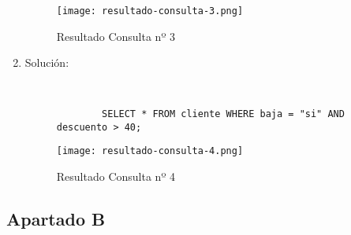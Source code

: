 \begin{enumerate}
    \begin{figure}[H]
        \centering
        \texttt{[image: resultado-consulta-3.png]}
        \caption{Resultado Consulta nº 3}
    \end{figure}

    \item Solución:

    \begin{figure}[H]
        \begin{tcolorbox}[sharp corners, colback=yellow!30, colframe=white!20]
            \scriptsize
            \begin{verbatim}


        SELECT * FROM cliente WHERE baja = "si" AND descuento > 40;
            \end{verbatim}
        \end{tcolorbox}
    \end{figure}

    \begin{figure}[H]
        \centering
        \texttt{[image: resultado-consulta-4.png]}
        \caption{Resultado Consulta nº 4}
    \end{figure}
\end{enumerate}

\subsection{Apartado B}




%
%

